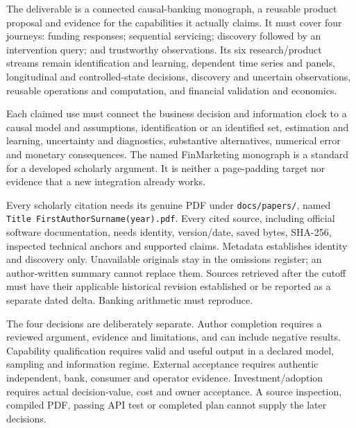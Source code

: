 \documentclass[
  10pt,
]{article}
\begin{document}
The deliverable is a connected causal-banking monograph, a reusable
product proposal and evidence for the capabilities it actually claims.
It must cover four journeys: funding responses; sequential servicing;
discovery followed by an intervention query; and trustworthy
observations. Its six research/product streams remain identification and
learning, dependent time series and panels, longitudinal and
controlled-state decisions, discovery and uncertain observations,
reusable operations and computation, and financial validation and
economics.

Each claimed use must connect the business decision and information
clock to a causal model and assumptions, identification or an identified
set, estimation and learning, uncertainty and diagnostics, substantive
alternatives, numerical error and monetary consequences. The named
FinMarketing monograph is a standard for a developed scholarly argument.
It is neither a page-padding target nor evidence that a new integration
already works.

Every scholarly citation needs its genuine PDF under
\texttt{docs/papers/}, named
\texttt{Title\ FirstAuthorSurname(year).pdf}. Every cited source,
including official software documentation, needs identity, version/date,
saved bytes, SHA-256, inspected technical anchors and supported claims.
Metadata establishes identity and discovery only. Unavailable originals
stay in the omissions register; an author-written summary cannot replace
them. Sources retrieved after the cutoff must have their applicable
historical revision established or be reported as a separate dated
delta. Banking arithmetic must reproduce.

The four decisions are deliberately separate. Author completion requires
a reviewed argument, evidence and limitations, and can include negative
results. Capability qualification requires valid and useful output in a
declared model, sampling and information regime. External acceptance
requires authentic independent, bank, consumer and operator evidence.
Investment/adoption requires actual decision-value, cost and owner
acceptance. A source inspection, compiled PDF, passing API test or
completed plan cannot supply the later decisions.
\end{document}
